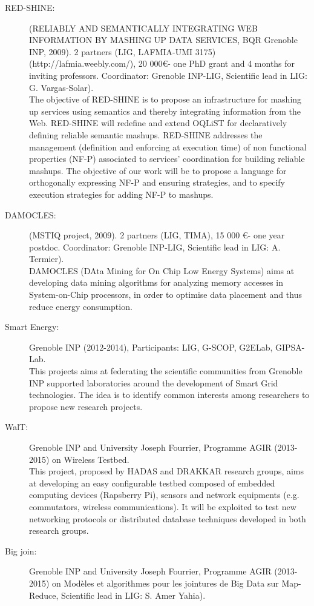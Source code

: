 \begin{description}

\item[RED-SHINE:] (RELIABLY AND SEMANTICALLY INTEGRATING WEB INFORMATION BY MASHING UP DATA SERVICES, BQR Grenoble INP, 2009). 2 partners (LIG, LAFMIA-UMI 3175)  (http://lafmia.weebly.com/), 20 000\euro - one PhD grant and 4 months for inviting professors. Coordinator: Grenoble INP-LIG, Scientific lead in LIG: G. Vargas-Solar). \\
The objective of RED-SHINE is to propose an infrastructure for mashing up services using semantics and thereby integrating information from the Web. RED-SHINE will redefine and extend OQLiST for declaratively defining reliable semantic mashups. RED-SHINE addresses the management (definition and enforcing at execution time) of non functional properties (NF-P) associated to services' coordination for building reliable mashups. The objective of our work will be to propose a language for orthogonally expressing NF-P and ensuring strategies, and to specify execution strategies for adding NF-P to mashups.\\

\item[DAMOCLES:] (MSTIQ project, 2009). 2 partners (LIG, TIMA), 15 000 \euro - one year postdoc. Coordinator: Grenoble INP-LIG, Scientific lead in LIG: A. Termier). \\
DAMOCLES (DAta Mining for On Chip Low Energy Systems) aims at developing data mining algorithms for analyzing memory accesses in System-on-Chip processors, in order to optimise data placement and thus reduce energy consumption.

\item[Smart Energy:] Grenoble INP (2012-2014), Participants: LIG, G-SCOP, G2ELab, GIPSA-Lab. \\
This projects aims at federating the scientific communities from Grenoble INP supported laboratories around the development of Smart Grid technologies.
The idea is to identify common interests among researchers to propose new research projects.

\item[WalT:] Grenoble INP and  University Joseph Fourrier, Programme AGIR (2013-2015) on Wireless Testbed. \\
This project, proposed by HADAS and DRAKKAR research groups, aims at developing an easy configurable testbed composed of embedded computing devices (Rapsberry Pi), sensors and network equipments (e.g. commutators, wireless communications). It will be exploited to test new networking protocols or distributed database techniques developed in both research groups.

\item[Big join:]  Grenoble INP and  University Joseph Fourrier, Programme AGIR (2013-2015) on Mod{\`e}les et algorithmes pour les jointures de Big Data sur Map-Reduce, Scientific lead in LIG: S. Amer Yahia). \\

	
\end{description}

